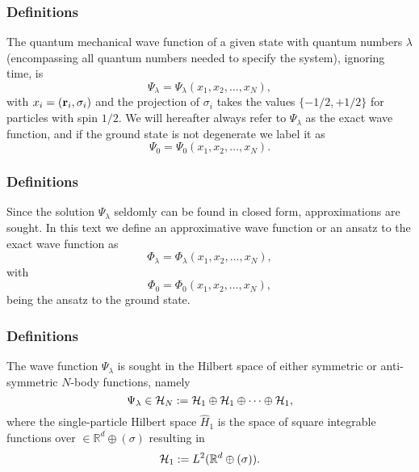 \documentclass{beamer}
\begin{document}
\begin{frame}
\frametitle{Definitions}

\begin{block}{}
The quantum mechanical wave function of a given state with quantum numbers $\lambda$ (encompassing all quantum numbers needed to specify the system), ignoring time, is
\[
\Psi_{\lambda}=\Psi_{\lambda}(x_1,x_2,\dots,x_N),
\]
with $x_i=({\bf r}_i,\sigma_i)$ and the projection of $\sigma_i$ takes the values
$\{-1/2,+1/2\}$ for particles with spin $1/2$. 
We will hereafter always refer to $\Psi_{\lambda}$ as the exact wave function, and if the ground state is not degenerate we label it as 
\[
\Psi_0=\Psi_0(x_1,x_2,\dots,x_N).
\]
\end{block}
\end{frame}

\begin{frame}
\frametitle{Definitions}

\begin{block}{}
Since the solution $\Psi_{\lambda}$ seldomly can be found in closed form, approximations are sought. In this text we define an approximative wave function or an ansatz to the exact wave function as 
\[
\Phi_{\lambda}=\Phi_{\lambda}(x_1,x_2,\dots,x_N),
\]
with
\[
\Phi_0=\Phi_0(x_1,x_2,\dots,x_N),
\]
being the ansatz to the ground state.  
\end{block}
\end{frame}

\begin{frame}
\frametitle{Definitions}

\begin{block}{}
The wave function $\Psi_{\lambda}$ is sought in the Hilbert space of either symmetric or anti-symmetric $N$-body functions, namely
\[
\Psi_{\lambda}\in {\cal H}_N:= {\cal H}_1\oplus{\cal H}_1\oplus\dots\oplus{\cal H}_1,
\]
where the single-particle Hilbert space $\hat{H}_1$ is the space of square integrable functions over
$\in {\mathbb{R}}^{d}\oplus (\sigma)$
resulting in
\[
{\cal H}_1:= L^2(\mathbb{R}^{d}\oplus (\sigma)).
\]
\end{block}
\end{frame}
\end{document}
